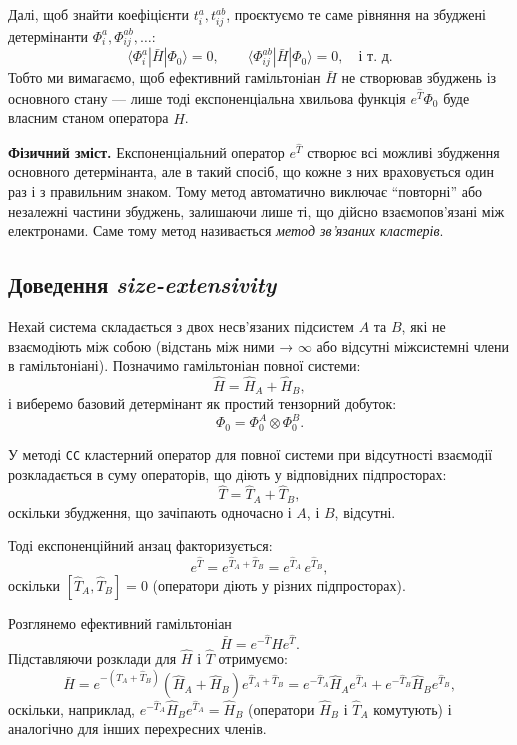 Далі, щоб знайти коефіцієнти \(t_i^a, t_{ij}^{ab}\), проєктуємо те саме рівняння
на збуджені детермінанти \(\Phi_i^a, \Phi_{ij}^{ab}, \ldots\):
\begin{equation}
    \langle \Phi_i^a | \bar{H} | \Phi_0 \rangle = 0, \qquad
    \langle \Phi_{ij}^{ab} | \bar{H} | \Phi_0 \rangle = 0, \quad \text{і т. д.}
\end{equation}
Тобто ми вимагаємо, щоб ефективний гамільтоніан \(\bar{H}\)
не створював збуджень із основного стану --- лише тоді
експоненціальна хвильова функція \(e^{\hat{T}} \Phi_0\) буде власним станом
оператора \(\hat{H}\).

\bigskip

\textbf{Фізичний зміст.}
Експоненціальний оператор \(e^{\hat{T}}\) створює всі можливі збудження
основного детермінанта, але в такий спосіб, що кожне з них враховується
один раз і з правильним знаком. Тому метод автоматично виключає
``повторні'' або незалежні частини збуджень, залишаючи лише ті,
що дійсно взаємопов'язані між електронами. Саме тому метод називається
\emph{метод зв'язаних кластерів}.



\subsection{Доведення \emph{size-extensivity}}

Нехай система складається з двох несв'язаних підсистем \(A\) та \(B\),
які не взаємодіють між собою (відстань між ними → \(\infty\) або відсутні міжсистемні члени в гамільтоніані).
Позначимо гамільтоніан повної системи:
\[
\hat{H} = \hat{H}_A + \hat{H}_B,
\]
і виберемо базовий детермінант як простий тензорний добуток:
\[
\Phi_0 = \Phi_0^A \otimes \Phi_0^B.
\]

У методі \texttt{CC} кластерний оператор для повної системи при відсутності взаємодії розкладається в суму операторів, що діють у відповідних підпросторах:
\[
\hat{T} = \hat{T}_A + \hat{T}_B,
\]
оскільки збудження, що зачіпають одночасно і \(A\), і \(B\), відсутні.

Тоді експоненційний анзац факторизується:
\[
e^{\hat{T}} = e^{\hat{T}_A + \hat{T}_B} = e^{\hat{T}_A}\, e^{\hat{T}_B},
\]
оскільки \([\hat{T}_A,\hat{T}_B]=0\) (оператори діють у різних підпросторах).

Розглянемо ефективний гамільтоніан
\[
\bar{H} = e^{-\hat{T}} \hat{H} e^{\hat{T}}.
\]
Підставляючи розклади для \(\hat{H}\) і \(\hat{T}\) отримуємо:
\[
\bar{H} = e^{-(\hat{T}_A+\hat{T}_B)}(\hat{H}_A+\hat{H}_B)e^{\hat{T}_A+\hat{T}_B}
= e^{-\hat{T}_A}\hat{H}_A e^{\hat{T}_A} + e^{-\hat{T}_B}\hat{H}_B e^{\hat{T}_B},
\]
оскільки, наприклад, \(e^{-\hat{T}_A}\hat{H}_B e^{\hat{T}_A}=\hat{H}_B\) (оператори \(\hat{H}_B\) і \(\hat{T}_A\) комутують)
і аналогічно для інших перехресних членів.

